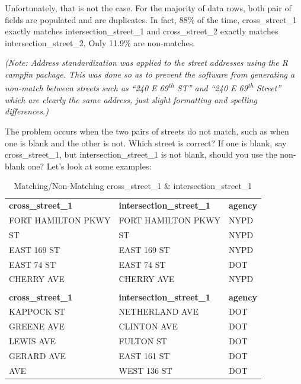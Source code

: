 \documentclass[12pt, titlepage]{article}
\begin{document}
{Unfortunately, that is not the case. For the majority of data rows, both pair of fields are populated and are duplicates.
In fact, 88\% of the time, cross\_street\_1 exactly matches intersection\_street\_1 and 
cross\_street\_2 exactly matches intersection\_street\_2, Only 11.9\% are non-matches.

\textit{(Note: Address standardization was applied to the street addresses using the R \emph{campfin} package. 
This was done so as to prevent the software from generating a non-match between 
streets such as ``240 E 69\textsuperscript{th} ST'' and ``240 E 69\textsuperscript{th} Street'' 
which are clearly the same address, just slight formatting and spelling differences.)}

The problem occurs when the two pairs of streets do not match, such as when one is blank and the
other is not. Which street is correct? If one is blank, say cross\_street\_1, but  intersection\_street\_1
is not blank, should you use the non-blank one?  Let's look at some examples:

\begin{table}[tbp]
    \centering
     \caption{Matching/Non-Matching cross\_street\_1 \& intersection\_street\_1}
    \footnotesize
    \begin{tabular}{>{\small\ttfamily}l >{\small\ttfamily}l >{\small\ttfamily}l}
        \toprule
        \multicolumn{3}{c}{\textbf{Matching cross\_street\_1 and intersection\_street\_1}} \\
        \midrule
        \textbf{cross\_street\_1} & \textbf{intersection\_street\_1} & \textbf{agency} \\
        \midrule
        FORT HAMILTON PKWY & FORT HAMILTON PKWY & NYPD \\
        87 ST              & 87 ST              & NYPD \\
        EAST 169 ST        & EAST 169 ST        & NYPD \\
        EAST 74 ST         & EAST 74 ST         & DOT  \\
        CHERRY AVE         & CHERRY AVE         & NYPD \\
        \midrule
        \multicolumn{3}{c}{\textbf{Non-matching cross\_street\_1 and intersection\_street\_1}} \\
        \midrule
        \textbf{cross\_street\_1} & \textbf{intersection\_street\_1} & \textbf{agency} \\
        \midrule
        KAPPOCK ST     & NETHERLAND AVE   & DOT \\
        GREENE AVE     & CLINTON AVE      & DOT \\
        LEWIS AVE      & FULTON ST        & DOT \\
        GERARD AVE     & EAST 161 ST      & DOT \\
        8 AVE          & WEST 136 ST      & DOT \\
        \bottomrule
    \end{tabular}
    \label{tab:streets1}
\end{table}

}
\end{document}
